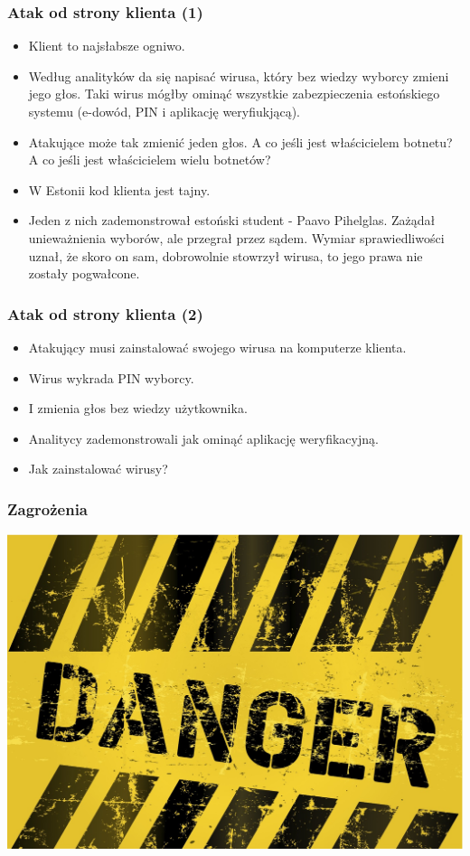 \documentclass{beamer}
\begin{document}
\begin{frame}
\frametitle{Atak od strony klienta (1)}\pause
\begin{itemize}
\item Klient to najsłabsze ogniwo.\pause
\item Według analityków da się napisać wirusa, który bez wiedzy wyborcy zmieni jego głos. Taki wirus mógłby ominąć wszystkie zabezpieczenia estońskiego systemu (e-dowód, PIN i aplikację weryfiukjącą).\pause
\item Atakujące może tak zmienić jeden głos. A co jeśli jest właścicielem botnetu? A co jeśli jest właścicielem wielu botnetów?\pause
\item W Estonii kod klienta jest tajny.\pause
\item Jeden z nich zademonstrował estoński student - Paavo Pihelglas. Zażądał unieważnienia wyborów, ale przegrał przez sądem. Wymiar sprawiedliwości uznał, że skoro on sam, dobrowolnie stowrzył wirusa, to jego prawa nie zostały pogwałcone.
\end{itemize}
\end{frame}

\begin{frame}
\frametitle{Atak od strony klienta (2)}
\begin{itemize}
\item  Atakujący musi zainstalować swojego wirusa na komputerze klienta.\pause
\item Wirus wykrada PIN wyborcy.\pause
\item I zmienia głos bez wiedzy użytkownika.\pause
\item Analitycy zademonstrowali jak ominąć aplikację weryfikacyjną.\pause
\item Jak zainstalować wirusy?
\end{itemize}
\end{frame}

\begin{frame}
\frametitle{Zagrożenia}
\includegraphics[height=0.8\paperheight, center]{danger}
\end{frame}
\end{document}
